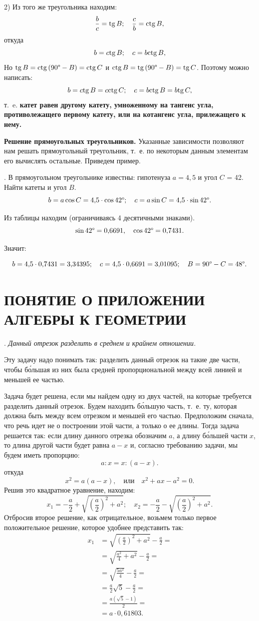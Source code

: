 \documentclass[oneside]{book}
\begin{document}
2) Из того же треугольника находим:
\[\frac bc=\mathrm{tg}\, B;
\quad
\frac cb=\mathrm{ctg}\, B,
\]
откуда
\[b=c\mathrm{tg}\, B;
\quad
c=b\mathrm{ctg}\, B,
\]
Но $\mathrm{tg}\, B=\mathrm{ctg}\,(90\degree-B)=\mathrm{ctg}\, C$ 
и $\mathrm{ctg}\, B=\mathrm{tg}\,(90\degree-B)=\mathrm{tg}\, C$.
Поэтому можно написать:
\[b=c\mathrm{tg}\, B=c\mathrm{ctg}\, C;
\quad
c=b\mathrm{ctg}\, B=b\mathrm{tg}\, C,
\]
т.~e.
\textbf{катет равен другому катету, умноженному на тангенс угла, противолежащего первому катету, или на котангенс угла, прилежащего к нему.}

\textbf{Решение прямоугольных треугольников.}
Указанные зависимости позволяют нам решать прямоугольный треугольник, т.~е. по некоторым данным элементам его вычислять остальные.
Приведем пример.

.
В прямоугольном треугольнике известны:
гипотенуза $a = 4{,}5$ и угол $C$ = 42\degree.
Найти катеты и угол $B$.
\[b = a\cos C = 4{,}5 \cdot \cos 42\degree;
\quad
c = a\sin C = 4{,}5 \cdot\sin42\degree.\]

Из таблицы находим (ограничиваясь 4 десятичными знаками).
\[\sin42\degree = 0{,}6691,
\quad
\cos 42\degree = 0{,}7431.\]

Значит:

\[b = 4{,}5\cdot 0{,}7431 = 3{,}34395;
\quad
c = 4{,}5\cdot 0{,}6691 = 3{,}01095;
\quad
B=90\degree -C=48\degree.
\]

\section{ПОНЯТИЕ О ПРИЛОЖЕНИИ АЛГЕБРЫ К ГЕОМЕТРИИ}

.
\emph{Данный отрезок разделить в среднем и крайнем отношении.}

Эту задачу надо понимать так:
разделить данный отрезок на такие две части, чтобы б\'{о}льшая из них была средней пропорциональной между всей линией и меньшей ее частью.

Задача будет решена, если мы найдем одну из двух частей, на которые требуется разделить данный отрезок.
Будем находить б\'{о}льшую часть, т.~е. ту, которая должна быть  между всем отрезком и меньшей его частью.
Предположим сначала, что речь идет не о построении этой части, а только о  ее длины.
Тогда задача решается  так:
если длину данного отрезка обозначим $a$, а длину б\'{о}льшей части $x$, то длина другой части будет равна $a-x$ и, согласно требованию задачи, мы будем иметь пропорцию:
\[a:x=x:(a-x).\]
откуда
\[x^2=a(a-x),
\quad\text{или}\quad
x^2+ax-a^2=0.\]
Решив это квадратное уравнение, находим:
\[
x_1=-\frac a2 + \sqrt{\left(\frac a2\right)^2+a^2};
\quad
x_2=-\frac a2 - \sqrt{\left(\frac a2\right)^2+a^2}.
\]
Отбросив второе решение, как отрицательное, возьмем только первое положительное решение, которое удобнее представить так:
\begin{align*}
x_1&= \sqrt{\left(\frac a2\right)^2+a^2}-\frac a2 =
\\
&= \sqrt{\frac {a^2}4+a^2}-\frac a2 =
\\
&= \sqrt{\frac {5a^2}4}-\frac a2 =
\\
&= \frac a2\sqrt{5}-\frac a2 =
\\
&= \frac {a(\sqrt{5}-1)}2 =
\\
&=a\cdot 0{,}61803.
\end{align*}
\end{document}
